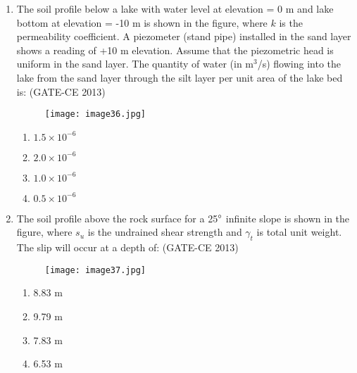 \documentclass[journal,12pt,onecolumn]{article}
\theoremstyle{remark}
\begin{document}
\begin{enumerate}
    \item The soil profile below a lake with water level at elevation = 0 m and lake bottom at elevation = -10 m is shown in the figure, where $k$ is the permeability coefficient. A piezometer (stand pipe) installed in the sand layer shows a reading of +10 m elevation. Assume that the piezometric head is uniform in the sand layer. The quantity of water (in m$^3$/s) flowing into the lake from the sand layer through the silt layer per unit area of the lake bed is: (GATE-CE 2013)
    \begin{figure}[H]
    \centering
    \texttt{[image: image36.jpg]}  
    \caption{}
    \label{fig:6}
    \end{figure}
    \begin{multicols}{4}
    \begin{enumerate}
        \item $1.5 \times 10^{-6}$ 
        \item $2.0 \times 10^{-6}$ 
        \item $1.0 \times 10^{-6}$ 
        \item $0.5 \times 10^{-6}$
    \end{enumerate}
    \end{multicols}
    
    \item The soil profile above the rock surface for a 25$\degree$ infinite slope is shown in the figure, where $s_u$ is the undrained shear strength and $\gamma_t$ is total unit weight. The slip will occur at a depth of: (GATE-CE 2013)
    \begin{figure}[H]
    \centering
    \texttt{[image: image37.jpg]}  
    \caption{}
    \label{fig:7}
    \end{figure}
    \begin{multicols}{4}
    \begin{enumerate}
        \item 8.83 m 
        \item 9.79 m 
        \item 7.83 m 
        \item 6.53 m
    \end{enumerate}
    \end{multicols}
    

\end{enumerate}
\end{document}
